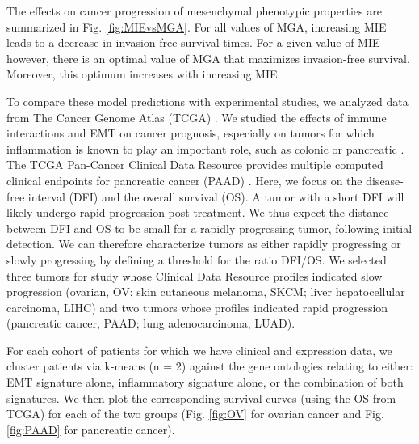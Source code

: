 \documentclass[11pt]{article}
\begin{document}
The effects on cancer progression of mesenchymal phenotypic properties are summarized in Fig. \ref{fig:MIEvsMGA}. For all values of MGA, increasing MIE leads to a decrease in invasion-free survival times. For a given value of MIE however, there is an optimal value of MGA that maximizes invasion-free survival. Moreover, this optimum increases with increasing MIE.
\par
To compare these model predictions with experimental studies, we analyzed data from The Cancer Genome Atlas (TCGA) \cite{Weinstein}. We studied the effects of immune interactions and EMT on cancer prognosis, especially on tumors for which inflammation is known to play an important role, such as colonic or pancreatic  \cite{greten2019inflammation,hu2010inflammation}.
The TCGA Pan-Cancer Clinical Data Resource provides multiple computed clinical endpoints for pancreatic cancer (PAAD) \cite{liu2018integrated}.
Here, we focus on the disease-free interval (DFI) and the overall survival (OS). A tumor with a short DFI will likely undergo rapid progression post-treatment. We thus expect the distance between DFI and OS to be small for a rapidly progressing tumor, following initial detection. We can therefore characterize tumors as either rapidly progressing or slowly progressing by defining a threshold for the ratio DFI/OS. We selected three tumors for study whose Clinical Data Resource profiles indicated slow progression (ovarian, OV; skin cutaneous melanoma, SKCM; liver hepatocellular carcinoma, LIHC) and two tumors whose profiles indicated rapid progression (pancreatic cancer, PAAD; lung adenocarcinoma, LUAD).
\par
For each cohort of patients for which we have clinical and expression data, we cluster patients via k-means (n = 2) against the gene ontologies relating to either: EMT signature alone, inflammatory signature alone, or the combination of both signatures. We then plot the corresponding survival curves (using the OS from TCGA) for each of the two groups (Fig.  \ref{fig:OV} for ovarian cancer and Fig. \ref{fig:PAAD} for pancreatic cancer).
\end{document}
